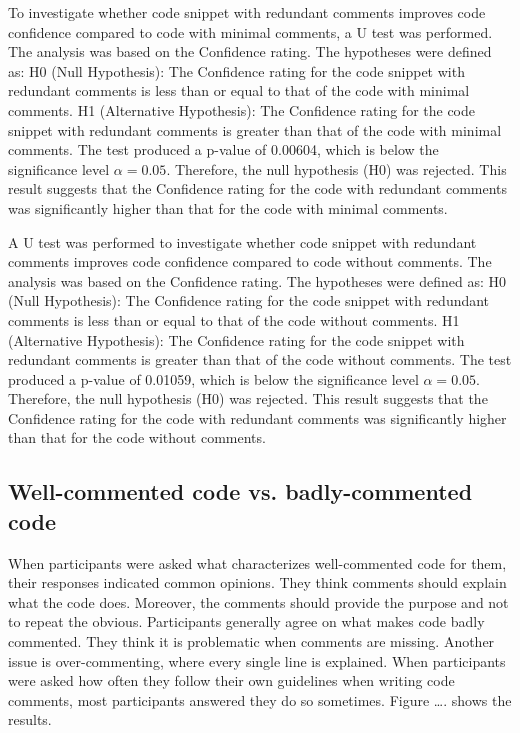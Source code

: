 To investigate whether code snippet with redundant comments improves code confidence compared to code with minimal comments, a U test was performed. The analysis was based on the Confidence rating. The hypotheses were defined as:  H0 (Null Hypothesis): The Confidence rating for the code snippet with redundant comments is less than or equal to that of the code with minimal comments.  H1 (Alternative Hypothesis): The Confidence rating for the code snippet with redundant comments is greater than that of the code with minimal comments.      
The test produced a p-value of  0.00604, which is below the significance level $\alpha = 0.05$. Therefore, the null hypothesis (H0) was rejected.  This result suggests that the Confidence rating  for the code with redundant comments was significantly higher than that for the code with minimal comments.   


A U test was performed to investigate whether code snippet with redundant comments improves code confidence compared to code without comments. The analysis was based on the Confidence rating. The hypotheses were defined as:  H0 (Null Hypothesis): The Confidence rating for the code snippet with redundant comments is less than or equal to that of the code without comments.  H1 (Alternative Hypothesis): The Confidence rating for the code snippet with redundant comments is greater than that of the code without comments.      
The test produced a p-value of  0.01059, which is below the significance level $\alpha = 0.05$. Therefore, the null hypothesis (H0) was rejected.  This result suggests that the Confidence rating  for the code with redundant comments was significantly higher than that for the code without comments.   



\subsection{Well-commented code vs. badly-commented code }

When participants were asked what characterizes well-commented code for them, their responses indicated common opinions. They think comments should explain what the code does. Moreover, the comments should provide the purpose and not to repeat the obvious. Participants generally agree on what makes code badly commented. They think it is problematic when comments are missing. Another issue is over-commenting, where every single line is explained.
When participants were asked how often they follow their own guidelines when writing code comments, most participants answered they do so sometimes. Figure …. shows the results.

